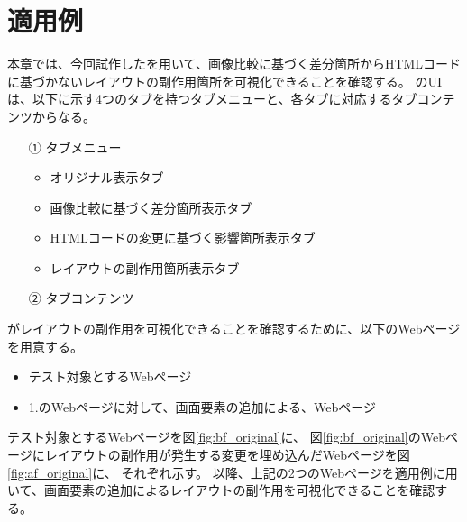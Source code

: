 \chapter{適用例}\label{cha:Indication}
本章では、今回試作した\toolName を用いて、画像比較に基づく差分箇所からHTMLコードに基づかないレイアウトの副作用箇所を可視化できることを確認する。
\toolName のUIは、以下に示す4つのタブを持つタブメニューと、各タブに対応するタブコンテンツからなる。
\begin{itemize}
    \item[①] タブメニュー
          \begin{itemize}
              \item オリジナル表示タブ
              \item 画像比較に基づく差分箇所表示タブ
              \item HTMLコードの変更に基づく影響箇所表示タブ
              \item レイアウトの副作用箇所表示タブ
          \end{itemize}
    \item[②] タブコンテンツ
\end{itemize}
\par
\toolName がレイアウトの副作用を可視化できることを確認するために、以下のWebページを用意する。
\begin{itemize}
    \setlength{\itemsep}{0pt}
          \setlength{\parsep}{0pt}
    \item テスト対象とするWebページ\label{item: ex1_bf}
    \item 1.のWebページに対して、画面要素の追加による、Webページ\label{item: ex1_af}
\end{itemize}
テスト対象とするWebページを図\ref{fig:bf_original}に、
図\ref{fig:bf_original}のWebページにレイアウトの副作用が発生する変更を埋め込んだWebページを図\ref{fig:af_original}に、
それぞれ示す。
以降、上記の2つのWebページを適用例に用いて、画面要素の追加によるレイアウトの副作用を可視化できることを確認する。

